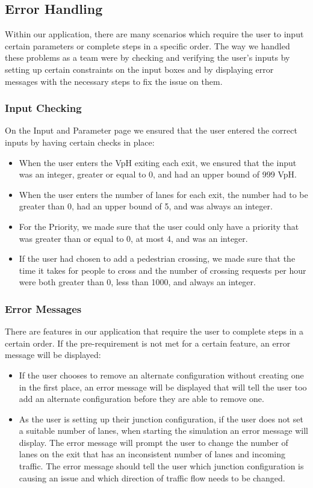 \documentclass{article}
\begin{document}
    \subsection{Error Handling}
    Within our application, there are many scenarios which require the user to input certain parameters or complete steps in a specific order. The way we handled these problems as a team were by checking and verifying the user's inputs by setting up certain constraints on the input boxes and by displaying error messages with the necessary steps to fix the issue on them.
    \subsubsection{Input Checking}
    On the Input and Parameter page we ensured that the user entered the correct inputs by having certain checks in place:
    \begin{itemize}
        \item When the user enters the VpH exiting each exit, we ensured that the input was an integer, greater or equal to 0, and had an upper bound of 999 VpH.
        \item When the user enters the number of lanes for each exit, the number had to be greater than 0, had an upper bound of 5, and was always an integer.
        \item For the Priority, we made sure that the user could only have a priority that was greater than or equal to 0, at most 4, and was an integer.
        \item If the user had chosen to add a pedestrian crossing, we made sure that the time it takes for people to cross and the number of crossing requests per hour were both greater than 0, less than 1000, and always an integer.
    \end{itemize}
    \subsubsection{Error Messages}
    There are features in our application that require the user to complete steps in a certain order. If the pre-requirement is not met for a certain feature, an error message will be displayed:
    \begin{itemize}
        \item If the user chooses to remove an alternate configuration without creating one in the first place, an error message will be displayed that will tell the user too add an alternate configuration before they are able to remove one.
        \item As the user is setting up their junction configuration, if the user does not set a suitable number of lanes, when starting the simulation an error message will display. The error message will prompt the user to change the number of lanes on the exit that has an inconsistent number of lanes and incoming traffic. The error message should tell the user which junction configuration is causing an issue and which direction of traffic flow needs to be changed.
    \end{itemize}
\end{document}
